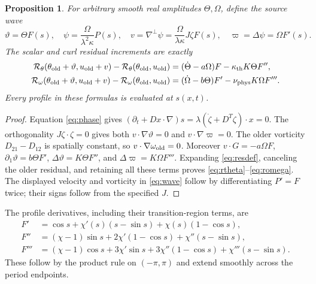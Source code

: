 \documentclass[11pt]{article}
\newtheorem{proposition}{Proposition}
\newcommand{\thd}{\kappa_{\rm th}}
\newcommand{\vis}{\nu_{\rm phys}}
\begin{document}
\begin{proposition}\label{prop:res}
For arbitrary smooth real amplitudes $\Theta,\Omega$, define the source wave
\begin{equation}\label{eq:wave}
 \vartheta=\Theta F(s),\quad
 \psi=\frac{\Omega}{\lambda^2\kappa}P(s),\quad
 v=\nabla^\perp\psi=\frac{\Omega}{\lambda\kappa}J\zeta F(s),\quad
 \varpi=\Delta\psi=\Omega F'(s).
\end{equation}
The scalar and curl residual increments are exactly
\begin{align}
 \mathcal R_\theta(\theta_{\rm old}+\vartheta,u_{\rm old}+v)
  -\mathcal R_\theta(\theta_{\rm old},u_{\rm old})
   &=(\dot\Theta-a\Omega)F-\thd K\Theta F'',\label{eq:rtheta}\\
 \mathcal R_\omega(\theta_{\rm old}+\vartheta,u_{\rm old}+v)
  -\mathcal R_\omega(\theta_{\rm old},u_{\rm old})
   &=(\dot\Omega-b\Theta)F'-\vis K\Omega F'''.\label{eq:romega}
\end{align}
Every profile in these formulas is evaluated at $s(x,t)$.
\end{proposition}
\begin{proof}
Equation \eqref{eq:phase} gives
$(\partial_t+Dx\cdot\nabla)s=
\lambda(\dot\zeta+D^T\zeta)\cdot x=0$.
The orthogonality $J\zeta\cdot\zeta=0$ gives both
$v\cdot\nabla\vartheta=0$ and $v\cdot\nabla\varpi=0$.
The older vorticity $D_{21}-D_{12}$ is spatially constant, so
$v\cdot\nabla\omega_{\rm old}=0$.
Moreover $v\cdot G=-a\Omega F$,
$\partial_1\vartheta=b\Theta F'$,
$\Delta\vartheta=K\Theta F''$, and
$\Delta\varpi=K\Omega F'''$.
Expanding \eqref{eq:resdef}, canceling the older residual, and retaining all
these terms proves \eqref{eq:rtheta}--\eqref{eq:romega}.
The displayed velocity and vorticity in \eqref{eq:wave} follow by
differentiating $P'=F$ twice; their signs follow from the specified $J$.
\end{proof}

The profile derivatives, including their transition-region terms, are
\begin{align}
 F'&=\cos s+\chi'(s)(s-\sin s)+\chi(s)(1-\cos s),\label{eq:dF}\\
 F''&=(\chi-1)\sin s+2\chi'(1-\cos s)+\chi''(s-\sin s),\label{eq:ddF}\\
 F'''&=(\chi-1)\cos s+3\chi'\sin s
              +3\chi''(1-\cos s)+\chi'''(s-\sin s).\label{eq:dddF}
\end{align}
These follow by the product rule on $(-\pi,\pi)$ and extend smoothly
across the period endpoints.
\end{document}
